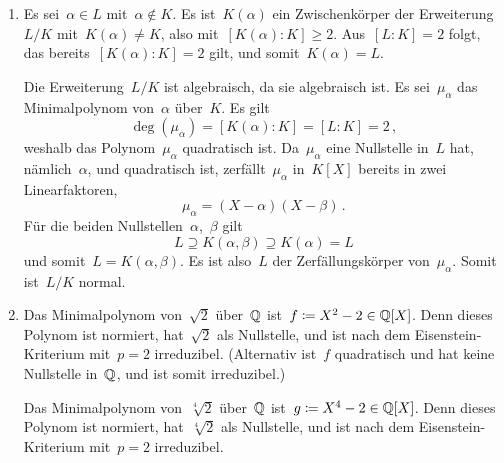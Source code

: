 \documentclass{scrartcl}
\begin{document}
\begin{solution}
  \begin{enumerate}
    \item
      Es sei~$\alpha \in L$ mit~$\alpha \notin K$.
      Es ist~$K(\alpha)$ ein Zwischenkörper der Erweiterung~$L / K$ mit~$K(\alpha) \neq K$, also mit~$[K(\alpha) : K] \geq 2$.
      Aus~$[L : K] = 2$ folgt, das bereits~$[K(\alpha) : K] = 2$ gilt, und somit~$K(\alpha) = L$.

      Die Erweiterung~$L/K$ ist algebraisch, da sie algebraisch ist.
      Es sei~$\mu_\alpha$ das Minimalpolynom von~$\alpha$ über~$K$.
      Es gilt
      \[
        \deg(\mu_\alpha)
        =
        [K(\alpha) : K]
        =
        [L : K]
        =
        2 \,,
      \]
      weshalb das Polynom~$\mu_\alpha$ quadratisch ist.
      Da~$\mu_\alpha$ eine Nullstelle in~$L$ hat, nämlich~$\alpha$, und quadratisch ist, zerfällt~$\mu_\alpha$ in~$K[X]$ bereits in zwei Linearfaktoren,
      \[
        \mu_\alpha
        =
        (X - \alpha) (X - \beta) \,.
      \]
      Für die beiden Nullstellen~$\alpha$,~$\beta$ gilt
      \[
        L
        \supseteq
        K(\alpha, \beta)
        \supseteq
        K(\alpha)
        =
        L
      \]
      und somit~$L = K(\alpha, \beta)$.
      Es ist also~$L$ der Zerfällungskörper von~$\mu_\alpha$.
      Somit ist~$L/K$ normal.
    \item
      Das Minimalpolynom von~$\sqrt{2}$ über~$\mathbb{Q}$ ist~$f \coloneqq X^2 - 2 \in \mathbb{Q}[X]$.
      Denn dieses Polynom ist normiert, hat~$\sqrt{2}$ als Nullstelle, und ist nach dem Eisenstein-Kriterium mit~$p = 2$ irreduzibel.
      (Alternativ ist~$f$ quadratisch und hat keine Nullstelle in~$\mathbb{Q}$, und ist somit irreduzibel.)
      
      Das Minimalpolynom von~$\sqrt[4]{2}$ über~$\mathbb{Q}$ ist~$g \coloneqq X^4 - 2 \in \mathbb{Q}[X]$.
      Denn dieses Polynom ist normiert, hat~$\sqrt[4]{2}$ als Nullstelle, und ist nach dem Eisenstein-Kriterium mit~$p = 2$ irreduzibel.


\end{enumerate}
\end{solution}
\end{document}

